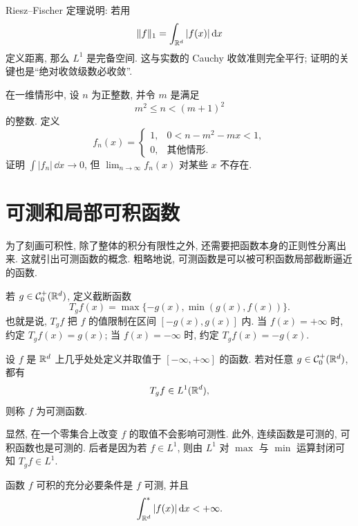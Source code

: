 \begin{rem}
	Riesz--Fischer 定理说明: 若用
	\[
	\|f\|_1=\int_{\mathbb{R}^d}|f(x)|\,\dd x
	\]
	定义距离, 那么 \(L^1\) 是完备空间. 这与实数的 Cauchy 收敛准则完全平行; 证明的关键也是``绝对收敛级数必收敛''.
\end{rem}

\begin{exer}
	在一维情形中, 设 \(n\) 为正整数, 并令 \(m\) 是满足
	\[
	m^2\leq n<(m+1)^2
	\]
	的整数. 定义
	\[
	f_n(x)=
	\begin{cases}
		1, & 0<n-m^2-mx<1,\\
		0, & \text{其他情形}.
	\end{cases}
	\]
	证明 \(\int |f_n|\,\dd x\to0\), 但 \(\lim_{n\to\infty}f_n(x)\) 对某些 \(x\) 不存在.
\end{exer}

\clearpage

\section{可测和局部可积函数}
\label{sec:measurable-and-locally-integrable-functions}

为了刻画可积性, 除了整体的积分有限性之外, 还需要把函数本身的正则性分离出来. 这就引出可测函数的概念. 粗略地说, 可测函数是可以被可积函数局部截断逼近的函数.

若 \(g\in\mathcal{C}_0^+(\mathbb{R}^d)\), 定义截断函数
\[
T_g f(x)=\max\{-g(x),\min(g(x),f(x))\}.
\]
也就是说, \(T_g f\) 把 \(f\) 的值限制在区间 \([-g(x),g(x)]\) 内. 当 \(f(x)=+\infty\) 时, 约定 \(T_g f(x)=g(x)\); 当 \(f(x)=-\infty\) 时, 约定 \(T_g f(x)=-g(x)\).

\begin{defn}[可测函数]
	\label{def:measurable-function}
	设 \(f\) 是 \(\mathbb{R}^d\) 上几乎处处定义并取值于 \([-\infty,+\infty]\) 的函数. 若对任意 \(g\in\mathcal{C}_0^+(\mathbb{R}^d)\), 都有
	\[
	T_g f\in L^1(\mathbb{R}^d),
	\]
	则称 \(f\) 为可测函数.
\end{defn}

显然, 在一个零集合上改变 \(f\) 的取值不会影响可测性. 此外, 连续函数是可测的, 可积函数也是可测的. 后者是因为若 \(f\in L^1\), 则由 \(L^1\) 对 \(\max\) 与 \(\min\) 运算封闭可知 \(T_g f\in L^1\).

\begin{thm}\label{thm:l1-iff-measurable-finite-upper-abs}
	函数 \(f\) 可积的充分必要条件是 \(f\) 可测, 并且
	\[
	\int_{\mathbb{R}^d}^{*}|f(x)|\,\dd x<+\infty.
	\]
\end{thm}

